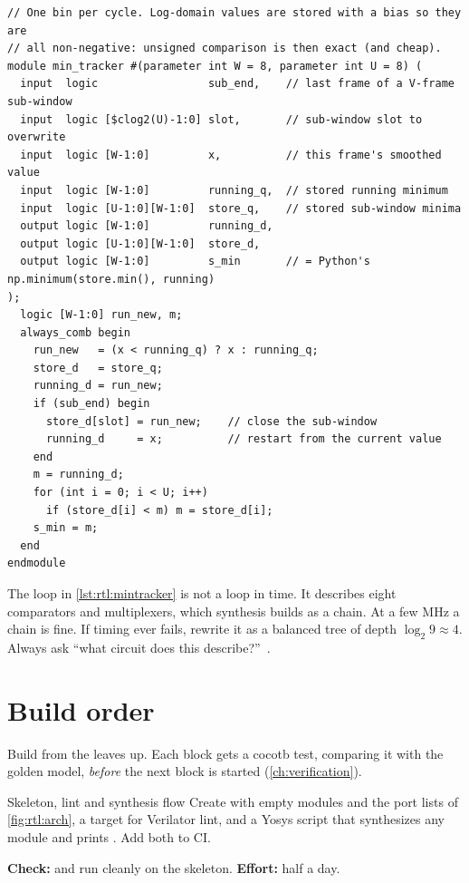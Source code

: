 \begin{lstlisting}[style=sv,caption={\texttt{min\_tracker}: per-bin logic of the two-stage minimum tracker.},label={lst:rtl:mintracker}]
// One bin per cycle. Log-domain values are stored with a bias so they are
// all non-negative: unsigned comparison is then exact (and cheap).
module min_tracker #(parameter int W = 8, parameter int U = 8) (
  input  logic                 sub_end,    // last frame of a V-frame sub-window
  input  logic [$clog2(U)-1:0] slot,       // sub-window slot to overwrite
  input  logic [W-1:0]         x,          // this frame's smoothed value
  input  logic [W-1:0]         running_q,  // stored running minimum
  input  logic [U-1:0][W-1:0]  store_q,    // stored sub-window minima
  output logic [W-1:0]         running_d,
  output logic [U-1:0][W-1:0]  store_d,
  output logic [W-1:0]         s_min       // = Python's np.minimum(store.min(), running)
);
  logic [W-1:0] run_new, m;
  always_comb begin
    run_new   = (x < running_q) ? x : running_q;
    store_d   = store_q;
    running_d = run_new;
    if (sub_end) begin
      store_d[slot] = run_new;    // close the sub-window
      running_d     = x;          // restart from the current value
    end
    m = running_d;
    for (int i = 0; i < U; i++)
      if (store_d[i] < m) m = store_d[i];
    s_min = m;
  end
endmodule
\end{lstlisting}

\begin{tipbox}
The  loop in \cref{lst:rtl:mintracker} is not a loop in time. It
describes eight comparators and multiplexers, which synthesis builds as a chain.
At a few MHz a chain is fine. If timing ever fails, rewrite it as a balanced tree
of depth $\log_2 9\approx4$. Always ask \enquote{what circuit does this
describe?}~\cite{harris2021ddca}.
\end{tipbox}

\section{Build order}\label{sec:rtl:steps}

Build from the leaves up. Each block gets a cocotb test, comparing it with the
golden model, \emph{before} the next block is started
(\cref{ch:verification}).

\begin{stepbox}[label=st:rtl:skeleton]{Skeleton, lint and synthesis flow}
Create  with empty modules and the port lists of
\cref{fig:rtl:arch}, a  target for Verilator lint, and a Yosys
script that synthesizes any module and prints . Add both to CI.

\textbf{Check:}  and  run cleanly on
the skeleton. \textbf{Effort:} half a day.
\end{stepbox}

